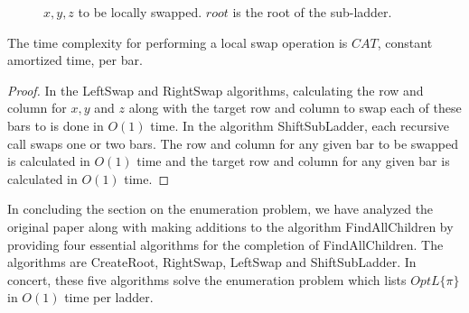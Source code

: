 \begin{figure}[!htp]
\begin{center}
\begin{minipage}{.5\textwidth}
	 \end{minipage}
	 \end{center}
	\caption{$x,y,z$ to be locally swapped. $root$ is the root of the sub-ladder.}
	\label{Fig:SwapAndShift}
\end{figure}

\begin{lemma}[h]
	The time complexity for performing a local swap operation is $CAT$, constant amortized time, per bar. 
\end{lemma}
\begin{proof}
	In the {\sc LeftSwap} and {\sc RightSwap} algorithms, calculating the row and column for $x,y$ and $z$ 
	along with the target row and column to swap each of these bars to is done in $O(1)$ time.
	In the algorithm {\sc ShiftSubLadder}, each recursive call swaps one or two bars. The row and 
	column for any given bar to be swapped is calculated in $O(1)$ time and the target row 
	and column for any given bar is calculated in $O(1)$ time.
\end{proof}

In concluding the section on the enumeration problem, we have analyzed the original paper along with 
making additions to the algorithm {\sc FindAllChildren} by providing four essential algorithms 
for the completion of {\sc FindAllChildren}. The algorithms are {\sc CreateRoot}, {\sc RightSwap},
{\sc LeftSwap} and {\sc ShiftSubLadder}. In concert, these five algorithms solve the enumeration 
problem which lists $OptL\{\pi\}$ in $O(1)$ time per ladder. 

